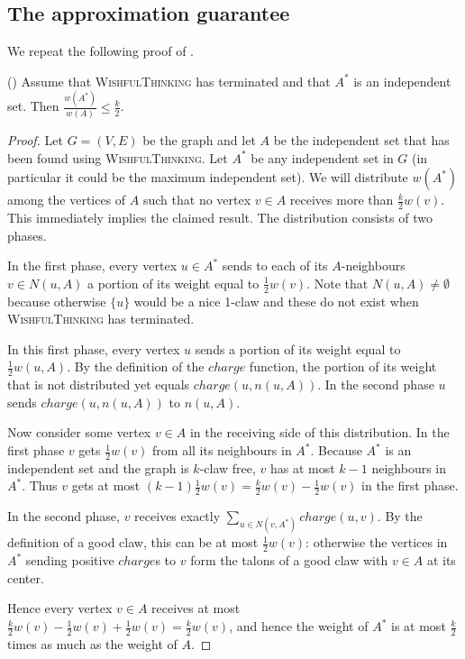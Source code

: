 \subsection{The approximation guarantee}\label{subsec:Approx}

We repeat the following proof of \cite{Berman}.
%
\begin{lemma}(\cite[Lemma 1]{Berman})\label{lem:Berman1}
Assume that \textsc{WishfulThinking} has terminated and that $A^*$ is an independent set. Then $\displaystyle \frac{w(A^*)}{w(A)} \leq \frac{k}{2}$.
\end{lemma}
%
\begin{proof}
Let $G = (V,E)$ be the graph and let $A$ be the independent set that has been found using \textsc{WishfulThinking}. Let $A^*$ be any independent set in $G$ (in particular it could be the maximum independent set). We will distribute $w(A^*)$ among the vertices of $A$ such that no vertex $v \in A$ receives more than $\frac{k}{2}w(v)$. This immediately implies the claimed result. The distribution consists of two phases.

In the first phase, every vertex $u \in A^*$ sends to each of its $A$-neighbours $v \in N(u,A)$ a portion of its weight equal to $\frac{1}{2}w(v)$. Note that $N(u,A) \neq \emptyset$ because otherwise $\{u\}$ would be a nice 1-claw and these do not exist when \textsc{WishfulThinking} has terminated.

In this first phase, every vertex $u$ sends a portion of its weight equal to $\frac{1}{2}w(u,A)$. By the definition of the $charge$ function, the portion of its weight that is not distributed yet equals $charge(u,n(u,A))$. In the second phase $u$ sends $charge(u,n(u,A))$ to $n(u,A)$.

Now consider some vertex $v \in A$ in the receiving side of this distribution. In the first phase $v$ gets $\frac{1}{2}w(v)$ from all its neighbours in $A^*$. Because $A^*$ is an independent set and the graph is $k$-claw free, $v$ has at most $k-1$ neighbours in $A^*$. Thus $v$ gets at most $(k-1)\frac{1}{2}w(v) = \frac{k}{2}w(v) - \frac{1}{2}w(v)$ in the first phase.

In the second phase, $v$ receives exactly $\sum_{u \in N(v,A^*)} charge(u,v)$. By the definition of a good claw, this can be at most $\frac{1}{2}w(v)$: otherwise the vertices in $A^*$ sending positive $charge$s to $v$ form the talons of a good claw with $v \in A$ at its center.

Hence every vertex $v \in A$ receives at most $\frac{k}{2}w(v) - \frac{1}{2}w(v) + \frac{1}{2}w(v) = \frac{k}{2}w(v)$, and hence the weight of $A^*$ is at most $\frac{k}{2}$ times as much as the weight of $A$.
\end{proof}

